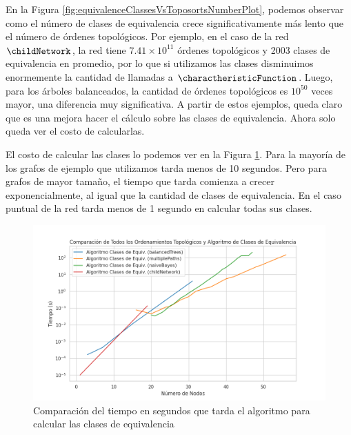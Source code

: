 En la Figura \ref{fig:equivalenceClassesVsToposortsNumberPlot}, podemos observar como el número de clases de equivalencia crece significativamente más lento que el número de órdenes topológicos. Por ejemplo, en el caso de la red $\childNetwork$, la red tiene $7.41\times10^{11}$ órdenes topológicos y 2003 clases de equivalencia en promedio, por lo que si utilizamos las clases disminuimos enormemente la cantidad de llamadas a $\charactheristicFunction$. Luego, para los árboles balanceados, la cantidad de órdenes topológicos es $10^{50}$ veces mayor, una diferencia muy significativa. A partir de estos ejemplos, queda claro que es una mejora hacer el cálculo sobre las clases de equivalencia. Ahora solo queda ver el costo de calcularlas. 

El costo de calcular las clases lo podemos ver en la Figura \ref{fig:equivalenceClassesTimePlot}. Para la mayoría de los grafos de ejemplo que utilizamos tarda menos de 10 segundos. Pero para grafos de mayor tamaño, el tiempo que tarda comienza a crecer exponencialmente, al igual que la cantidad de clases de equivalencia. En el caso puntual de la red \childNetwork tarda menos de 1 segundo en calcular todas sus clases. 


\begin{figure}[ht]
	\centering
	\includegraphics[width=1\linewidth]{img/equivalentClasses_time.png}
	\caption[Caption for image]{Comparación del tiempo en segundos que tarda el algoritmo para calcular las clases de equivalencia}
	\label{fig:equivalenceClassesTimePlot}
\end{figure}

